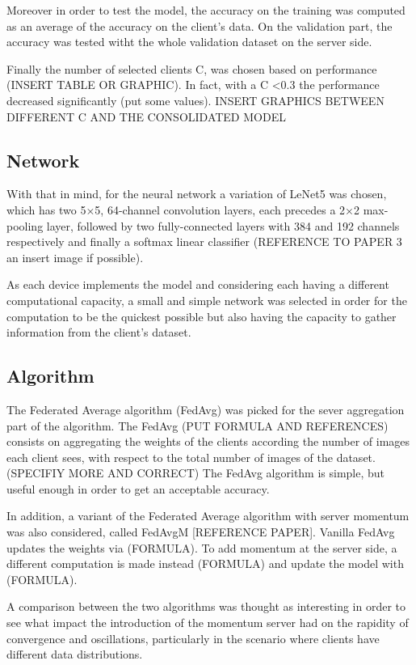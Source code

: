 \documentclass[twocolumn]{article}
\begin{document}
Moreover in order to test the model, the accuracy on the training was computed as an average of the accuracy on the client's data. On the validation part, the accuracy was tested witht the whole validation dataset on the server side.

Finally the number of selected clients C, was chosen based on performance (INSERT TABLE OR GRAPHIC). In fact, with a C <0.3 the performance decreased significantly (put some values).
INSERT GRAPHICS BETWEEN DIFFERENT C AND THE CONSOLIDATED MODEL

\subsection{Network}

With that in mind, for the neural network a variation of LeNet5 was chosen, which has two 5×5, 64-channel convolution layers, each precedes a 2×2 max-pooling layer, followed by two fully-connected layers with 384 and 192 channels respectively and finally a softmax linear classifier (REFERENCE TO PAPER 3 an insert image if possible). 

As each device implements the model and considering each having a different computational capacity, a small and simple network was selected in order for the computation to be the quickest possible but also having the capacity to gather information from the client's dataset.

\subsection{Algorithm}
The Federated Average algorithm (FedAvg) was picked for the sever aggregation part of the algorithm. The FedAvg (PUT FORMULA AND REFERENCES) consists on aggregating the weights of the clients according the number of images each client sees, with respect to the total number of images of the dataset.(SPECIFIY MORE AND CORRECT)
The FedAvg algorithm is simple, but useful enough in order to get an acceptable accuracy.

In addition, a variant of the Federated Average algorithm with server momentum was also considered, called FedAvgM [REFERENCE PAPER]. Vanilla FedAvg updates the weights via (FORMULA). To add momentum at the server side, a different computation is made instead (FORMULA) and update the model with (FORMULA). 

A comparison between the two algorithms was thought as interesting in order to see what impact the introduction of the momentum server had on the rapidity of convergence and oscillations, particularly in the scenario where clients have different data distributions.
\end{document}
